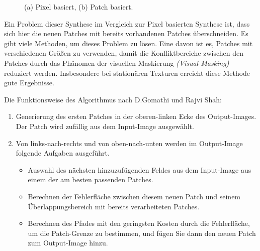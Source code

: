 \documentclass[12pt, a4paper,twoside,openright]{report} %
\begin{document}
\begin{figure}[H]
    \centering
    \qquad
    \caption{(a) Pixel basiert, (b) Patch basiert.}%
\end{figure}

Ein Problem dieser Synthese im Vergleich zur Pixel basierten Synthese ist, dass sich hier die neuen Patches mit bereits vorhandenen Patches überschneiden.
Es gibt viele Methoden, um dieses Problem zu lösen.
Eine davon ist es, Patches mit verschiedenen Größen zu verwenden, damit die Konfliktbereiche zwischen den Patches durch das Phänomen der visuellen Maskierung
\textit{(Visual Masking)} reduziert werden.
Insbesondere bei stationären Texturen erreicht diese Methode gute Ergebnisse. \cite{EfrosQuilt}

Die Funktionsweise des Algorithmus nach D.Gomathi und Rajvi Shah:

\begin{enumerate}
    \item Generierung des ersten Patches in der oberen-linken Ecke des Output-Images. Der Patch wird zufällig aus dem Input-Image ausgewählt.
    \item Von links-nach-rechts und von oben-nach-unten werden im Output-Image folgende Aufgaben ausgeführt.
    \begin{itemize}
        \item Auswahl des nächsten hinzuzufügenden Feldes aus dem Input-Image aus einem der am besten passenden Patches.
        \item Berechnen der Fehlerfläche zwischen diesem neuen Patch und seinem Überlappungsbereich mit bereits
        verarbeiteten Patches.
        \item Berechnen des Pfades mit den geringsten Kosten durch die Fehlerfläche, um die Patch-Grenze zu bestimmen, und fügen Sie dann den neuen Patch zum Output-Image hinzu.
    \end{itemize}
\end{enumerate}
\end{document}
